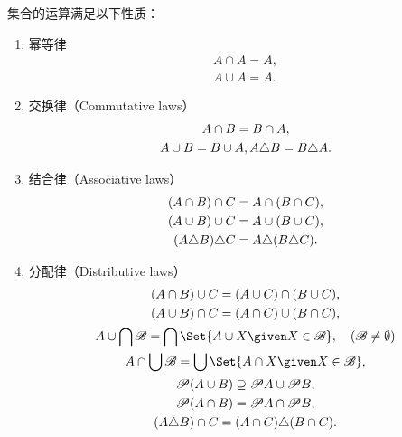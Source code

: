 \begin{property}
集合的运算满足以下性质：
\begin{enumerate}
\item 幂等律
\begin{gather}
	A \cap A = A, \\
	A \cup A = A.
\end{gather}

\item 交换律（{\rm Commutative laws}）
\begin{gather}
	A \cap B = B \cap A, \label{equation:集合论.集合代数公式1-1} \\
	A \cup B = B \cup A, \label{equation:集合论.集合代数公式1-2}
	A \triangle B = B \triangle A.
\end{gather}

\item 结合律（{\rm Associative laws}）
\begin{gather}
	(A \cap B) \cap C = A \cap (B \cap C), \label{equation:集合论.集合代数公式2-1} \\
	(A \cup B) \cup C = A \cup (B \cup C), \label{equation:集合论.集合代数公式2-2} \\
	(A \triangle B) \triangle C = A \triangle (B \triangle C).
\end{gather}

\item 分配律（{\rm Distributive laws}）
\begin{gather}
	(A \cap B) \cup C = (A \cup C) \cap (B \cup C), \label{equation:集合论.集合代数公式3-1} \\
	(A \cup B) \cap C = (A \cap C) \cup (B \cap C), \label{equation:集合论.集合代数公式3-2} \\
	A \cup \bigcap \mathscr{B} = \bigcap\Set{A \cup X \given X \in \mathscr{B}}, \quad(\mathscr{B}\neq\emptyset) \label{equation:集合论.集合代数公式3-3} \\
	A \cap \bigcup \mathscr{B} = \bigcup\Set{A \cap X \given X \in \mathscr{B}}, \label{equation:集合论.集合代数公式3-4} \\
	\Powerset (A \cup B) \supseteq \Powerset A \cup \Powerset B, \label{equation:集合论.集合代数公式3-5} \\ %
	\Powerset (A \cap B) = \Powerset A \cap \Powerset B, \label{equation:集合论.集合代数公式3-6} \\ %
	(A \symdiff B) \cap C = (A \cap C) \symdiff (B \cap C).
\end{gather}


\end{enumerate}
\end{property}
